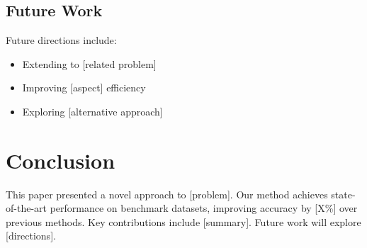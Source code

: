 \documentclass[conference]{IEEEtran}
\theoremstyle{plain}
\theoremstyle{definition}
\begin{document}
\subsection{Future Work}

Future directions include:
\begin{itemize}
  \item Extending to [related problem]
  \item Improving [aspect] efficiency
  \item Exploring [alternative approach]
\end{itemize}

\section{Conclusion}
\label{sec:conclusion}

This paper presented a novel approach to [problem]. Our method achieves
state-of-the-art performance on benchmark datasets, improving accuracy
by [X\%] over previous methods. Key contributions include [summary].
Future work will explore [directions].

\balance



\end{document}
